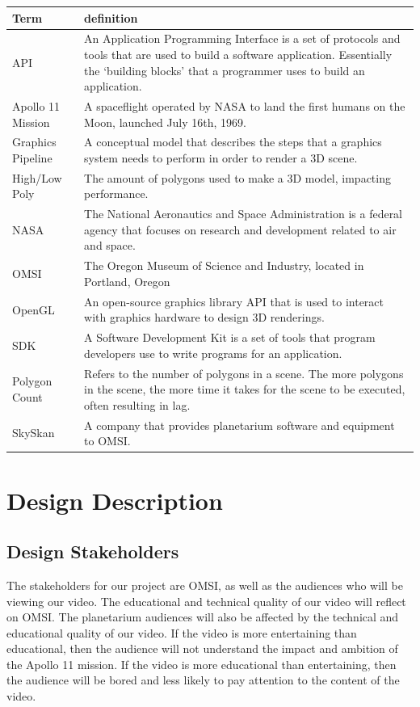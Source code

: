 \documentclass[onecolumn, draftclsnofoot,10pt, compsoc]{IEEEtran}
\begin{document}
\begin{tabular} {|l|p{13.5cm}|}
\hline
Term & definition \\ \hline
API & An Application Programming Interface is a set of protocols and tools that are used to build a software application. Essentially the `building blocks' that a programmer uses to build an application.  \\ \hline
Apollo 11 Mission & A spaceflight operated by NASA to land the first humans on the Moon, launched July 16th, 1969.  \\ \hline
Graphics Pipeline & A conceptual model that describes the steps that a graphics system needs to perform in order to render a 3D scene. \\ \hline
High/Low Poly & The amount of polygons used to make a 3D model, impacting performance.\\ \hline
NASA & The National Aeronautics and Space Administration is a federal agency that focuses on research and development related to air and space.	\\ \hline
OMSI & The Oregon Museum of Science and Industry, located in Portland, Oregon	\\ \hline
OpenGL & An open-source graphics library API that is used to interact with graphics hardware to design 3D renderings.	\\ \hline
SDK & A Software Development Kit is a set of tools that program developers use to write programs for an application. \\ \hline
Polygon Count & Refers to the number of polygons in a scene. The more polygons in the scene, the more time it takes for the scene to be executed, often resulting in lag. \\ \hline
SkySkan & A company that provides planetarium software and equipment to OMSI. \\ \hline

\end{tabular}

\section{Design Description}

    \subsection{Design Stakeholders}
    The stakeholders for our project are OMSI, as well as the audiences who will be viewing our video. The educational and technical quality of our video will reflect on OMSI. The planetarium audiences will also be affected by the technical and educational quality of our video. If the video is more entertaining than educational, then the audience will not understand the impact and ambition of the Apollo 11 mission. If the video is more educational than entertaining, then the audience will be bored and less likely to pay attention to the content of the video.
    
\end{document}
